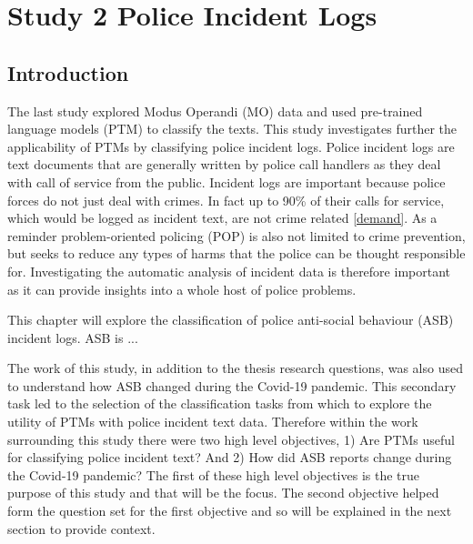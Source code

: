 
\chapter{Study 2  Police Incident Logs}


\section{Introduction}

The last study explored Modus Operandi (MO) data and used pre-trained language models (PTM) to classify the texts. This study investigates further the applicability of PTMs by classifying police incident logs.  Police incident logs are text documents that are generally written by police call handlers as they deal with call of service from the public. Incident logs are important because police forces do not just deal with crimes. In fact up to 90\% of their calls for service, which would be logged as incident text, are not crime related \ref{demand}. As a reminder problem-oriented policing (POP) is also not limited to crime prevention, but seeks to reduce any types of harms that the police can be thought responsible for. Investigating the automatic analysis of incident data is therefore important as it can provide insights into a whole host of police problems. 

This chapter will explore the classification of police anti-social behaviour (ASB) incident logs. ASB is ... 

The work of this study, in addition to the thesis research questions, was also used to understand how ASB changed during the Covid-19 pandemic. This secondary task led to the selection of the classification tasks from which to explore the utility of PTMs with police incident text data. Therefore within the work surrounding this study there were two high level objectives, 1) Are PTMs useful for classifying police incident text? And 2) How did ASB reports change during the Covid-19 pandemic? The first of these high level objectives is the true purpose of this study and that will be the focus. The second objective helped form the question set for the first objective and so will be explained in the next section to provide context. 

